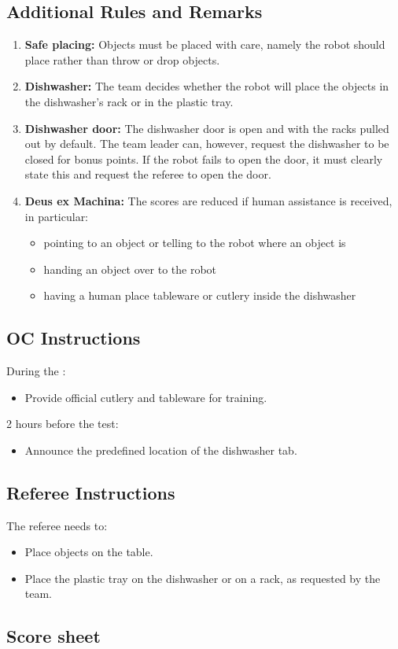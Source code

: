\subsection*{Additional Rules and Remarks}
\begin{enumerate}[nosep]
	\item \textbf{Safe placing:} Objects must be placed with care, namely the robot should place rather than throw or drop objects.
	\item \textbf{Dishwasher:} The team decides whether the robot will place the objects in the dishwasher's rack or in the plastic tray.
	\item \textbf{Dishwasher door:} The dishwasher door is open and with the racks pulled out by default.
	The team leader can, however, request the dishwasher to be closed for bonus points. If the robot fails to open the door, it must clearly state this and request the referee to open the door.
	\item \textbf{Deus ex Machina:} The scores are reduced if human assistance is received, in particular:
	\begin{itemize}[nosep]
		\item pointing to an object or telling to the robot where an object is
		\item handing an object over to the robot
		\item having a human place tableware or cutlery inside the dishwasher
	\end{itemize}
\end{enumerate}

\subsection*{OC Instructions}

During the \SetupDays:
\begin{itemize}
	\item Provide official cutlery and tableware for training.
\end{itemize}
2 hours before the test:
\begin{itemize}
	\item Announce the predefined location of the dishwasher tab.
\end{itemize}


\subsection*{Referee Instructions}

The referee needs to:
\begin{itemize}
	\item Place objects on the table.
	\item Place the plastic tray on the dishwasher or on a rack, as requested by the team.
\end{itemize}

\subsection*{Score sheet}


